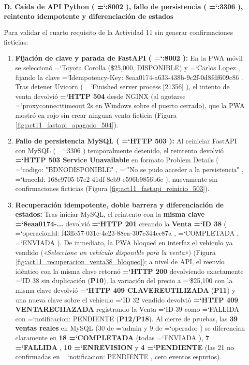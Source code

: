 \documentclass[11pt,a4paper]{article}
\renewcommand{\_}{\oldunderscore\allowbreak}
\DeclareRobustCommand{\texttt}[1]{%
  {\upshape\ttfamily\fontsize{9}{10.8}\selectfont\hyphenchar\font=`\-\relax #1}%
}
\begin{document}
\vspace{0.2cm}
\noindent\textbf{D. Caída de API Python (\texttt{:8002}), fallo de persistencia (\texttt{:3306}), reintento idempotente y diferenciación de estados}

\noindent Para validar el cuarto requisito de la Actividad 11 sin generar confirmaciones ficticias:
\begin{enumerate}[leftmargin=*,itemsep=2pt,topsep=1pt]
  \item \textbf{Fijación de clave y parada de FastAPI (\texttt{:8002}):} En la PWA móvil se seleccionó \texttt{[ID 32] Toyota Corolla (\$25,\allowbreak{}000, DISPONIBLE)} y \texttt{[ID 9] Carlos Lopez}, fijando la clave \texttt{Idempotency-Key: 8eaa0174-a633-438b-9c2f-0d8fdf609c86}. Tras detener Uvicorn (\texttt{Finished server process [21356]}), el intento de venta devolvió \textbf{\texttt{HTTP 504}} desde NGINX (al agotarse \texttt{proxy\_connect\_timeout 2s} en Windows sobre el puerto cerrado), que la PWA mostró en rojo sin crear ninguna venta ficticia (Figura \ref{fig:act11_fastapi_apagado_504}).
  \item \textbf{Fallo de persistencia MySQL (\texttt{HTTP 503}):} Al reiniciar FastAPI con MySQL (\texttt{:3306}) temporalmente detenido, el reintento devolvió \textbf{\texttt{HTTP 503 Service Unavailable}} en formato Problem Details (\texttt{codigo: "BD\_NO\_DISPONIBLE"}, \texttt{"No se pudo acceder a la persistencia"}, \texttt{traceId: 168c9705-67e2-41df-8eb9-e596b9856b6c}), nuevamente sin confirmaciones ficticias (Figura \ref{fig:act11_fastapi_reinicio_503}).
  \item \textbf{Recuperación idempotente, doble barrera y diferenciación de estados:} Tras iniciar MySQL, el reintento con la \textbf{misma clave \texttt{8eaa0174-...}} devolvió \textbf{\texttt{HTTP 201}} creando la \textbf{Venta \texttt{ID 38}} (\texttt{operacionId: f43ffc57-031c-4c23-88ea-307e344cc87a}, \texttt{COMPLETADA}, \texttt{ENVIADA}). De inmediato, la PWA bloqueó en interfaz el vehículo ya vendido (\textit{«Seleccione un vehículo disponible para la venta»}) (Figura \ref{fig:act11_recuperacion_venta38_bloqueo}); a nivel de API, el reenvío idéntico con la misma clave retornó \textbf{\texttt{HTTP 200}} devolviendo exactamente \texttt{ID 38} sin duplicación (\textbf{P10}), la variación del precio a \texttt{\$25,100} con la misma clave devolvió \textbf{\texttt{HTTP 409 CLAVE\_REUTILIZADA}} (\textbf{P11}) y una nueva clave sobre el vehículo \texttt{ID 32} vendido devolvió \textbf{\texttt{HTTP 409 VENTA\_RECHAZADA}} registrando la Venta \texttt{ID 39} como \texttt{FALLIDA} con \texttt{notificacion: PENDIENTE} (\textbf{P12/P18}). Al cierre de pruebas, las \textbf{39 ventas reales} en MySQL (30 de \texttt{admin} y 9 de \texttt{operador}) se diferencian claramente en \textbf{18 \texttt{COMPLETADA}} (todas \texttt{ENVIADA}), \textbf{7 \texttt{FALLIDA}}, \textbf{10 \texttt{EN\_REVISION}} y \textbf{4 \texttt{PENDIENTE}} (las 21 no confirmadas en \texttt{notificacion: PENDIENTE}, cero eventos espurios).
\end{enumerate}
\end{document}
